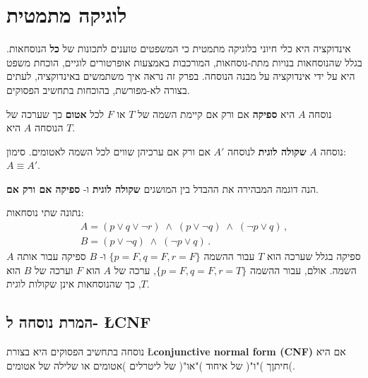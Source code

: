 
\chapter{לוגיקה מתמטית}\label{s.logic}

אינדוקציה היא כלי חיוני בלוגיקה מתמטית כי המשפטים טוענים לתכונות של 
\textbf{כל}
הנוסחאות. בגלל שהנוסחאות בנויות מתת-נוסחאות, המורכבות באמצעות אופרטורים לוגיים, הוכחת משפט היא על ידי אינדוקציה על מבנה הנוסחה. בפרק זה נראה איך משתמשים באינדוקציה, לעתים בצורה לא-מפורשת, בהוכחות בתחשיב הפסוקים.

\begin{definition}
נוסחה 
$A$
היא 
\textbf{ספיקה}
אם ורק אם קיימת השמה של
$T$
או
$F$
לכל
\textbf{אטום}
כך שערכה של הנוסחה
$A$
היא
$T$.
\end{definition}

\begin{definition}
נוסחה
$A$
\textbf{שקולה לוגית}
לנוסחה
$A'$
אם ורק אם ערכיהן שווים לכל השמה לאטומים. סימון:
$A\equiv A'$.
\end{definition}

הנה דוגמה המבהירה את ההבדל בין המושגים 
\textbf{שקולה לוגית}
ו-
\textbf{ספיקה אם ורק אם}.

נתונה שתי נוסחאות:
\[
\begin{array}{l}
A=(p \vee q \vee \neg r) \;\wedge\; (p \vee \neg q) \;\wedge\; (\neg p \vee q)\,,\\
B=(p \vee \neg q) \;\wedge\; (\neg p \vee q)\,.
\end{array}
\]
$A$
ספיקה בגלל שערכה הוא
$T$
עבור ההשמה
$\{p=F,q=F,r=F\}$
ו-
$B$
ספיקה עבור אותה השמה. אולם, עבור ההשמה
$\{p=F,q=F,r=T\}$,
ערכה של
$A$
הוא
$F$
וערכה של
$B$
הוא
$T$,
כך שהנוסחאות אינן שקולות לוגית.

\section{%
המרת נוסחה ל-%
\L{\small CNF}
}

\begin{definition}
נוסחה בתחשיב הפסוקים היא בצורת
\L{\textbf{conjunctive normal form (\small CNF)}}
אם היא חיתןך )"ו"( של איחוד )"או"( של ליטרלים )אטומים או שלילה של אטומים(.
\end{definition}

